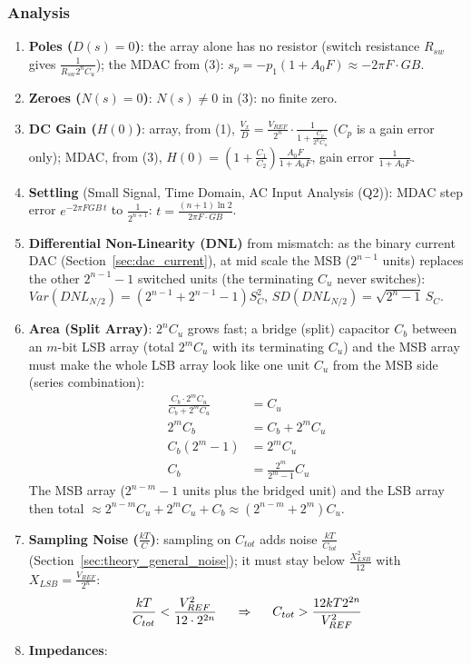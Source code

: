\subsubsection{Analysis}
\begin{enumerate}
  \item \textbf{Poles (\(D(s) = 0\))}: the array alone has no resistor (switch resistance \(R_{sw}\) gives
    \(\frac{1}{R_{sw} 2^n C_u}\)); the MDAC from (3): \(s_p = -p_1(1 + A_0 F) \approx -2\pi F \cdot GB\).
  \item \textbf{Zeroes (\(N(s) = 0\))}: \(N(s) \neq 0\) in (3): no finite zero.
  \item \textbf{DC Gain (\(H(0)\))}: array, from (1), \(\frac{V_x}{D} = \frac{V_{REF}}{2^n}\cdot\frac{1}{1 + \frac{C_p}{2^n C_u}}\) (\(C_p\) is a
    gain error only); MDAC, from (3), \(H(0) = \left(1 + \frac{C_1}{C_2}\right)\frac{A_0 F}{1 + A_0 F}\), gain error \(\frac{1}{1 + A_0 F}\).
  \item \textbf{Settling} (Small Signal, Time Domain, AC Input Analysis (Q2)): MDAC step error
    \(e^{-2\pi F GB\, t}\) to \(\frac{1}{2^{n+1}}\): \(t = \frac{(n + 1)\ln 2}{2\pi F \cdot GB}\).
  \item \textbf{Differential Non-Linearity (DNL)} from mismatch: as the binary current DAC (Section~\ref{sec:dac_current}), at mid scale
    the MSB (\(2^{n-1}\) units) replaces the other \(2^{n-1} - 1\) switched units
    (the terminating \(C_u\) never switches):
    \(Var(DNL_{N/2}) = (2^{n-1} + 2^{n-1} - 1) S_C^2\),
    \(SD(DNL_{N/2}) = \sqrt{2^n - 1}\, S_C\).
  \item \textbf{Area (Split Array)}: \(2^n C_u\) grows fast; a bridge (split) capacitor
    \(C_b\) between an \(m\)-bit LSB array (total \(2^m C_u\) with its
    terminating \(C_u\)) and the MSB array must make the whole LSB array look
    like one unit \(C_u\) from the MSB side (series combination):
    \begin{align*}
      \frac{C_b \cdot 2^m C_u}{C_b + 2^m C_u} &= C_u \\
      2^m C_b &= C_b + 2^m C_u \\
      C_b (2^m - 1) &= 2^m C_u \\
      C_b &= \frac{2^{m}}{2^{m} - 1} C_u
    \end{align*}
    The MSB array (\(2^{n-m} - 1\) units plus the bridged unit) and the LSB
    array then total \(\approx 2^{n-m} C_u + 2^m C_u + C_b \approx (2^{n-m} + 2^m) C_u\).
  \item \textbf{Sampling Noise (\(\frac{kT}{C}\))}: sampling on \(C_{tot}\) adds noise
    \(\frac{kT}{C_{tot}}\) (Section~\ref{sec:theory_general_noise}); it must stay
    below \(\frac{X_{LSB}^2}{12}\) with \(X_{LSB} = \frac{V_{REF}}{2^n}\):
    \[
      \frac{kT}{C_{tot}} < \frac{V_{REF}^2}{12 \cdot 2^{2n}}
      \hspace{0.5cm} \Rightarrow \hspace{0.5cm}
      C_{tot} > \frac{12 kT 2^{2n}}{V_{REF}^2}
    \]
  \item \textbf{Impedances}:

\end{enumerate}

